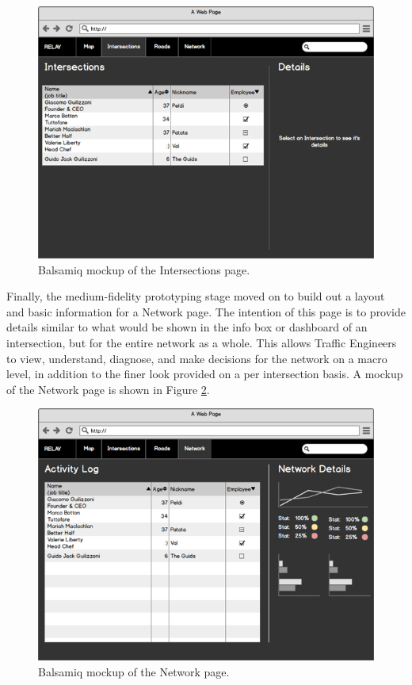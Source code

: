 \documentclass{report}
\begin{document}
\begin{figure}[htbp!]
  \begin{centering}
    \includegraphics[scale=0.65]{figures/bals-4.png}
    \caption{Balsamiq mockup of the Intersections page.}
    \label{fig:bals-4}
  \end{centering}
\end{figure}

Finally, the medium-fidelity prototyping stage moved on to build out a layout and basic information for a Network page.
The intention of this page is to provide details similar to what would be shown in the info box or dashboard of an intersection, but for the entire network as a whole.
This allows Traffic Engineers to view, understand, diagnose, and make decisions for the network on a macro level, in addition to the finer look provided on a per intersection basis.
A mockup of the Network page is shown in Figure \ref{fig:bals-5}. \\

\begin{figure}[htbp!]
  \begin{centering}
    \includegraphics[scale=0.6]{figures/bals-5.png}
    \caption{Balsamiq mockup of the Network page.}
    \label{fig:bals-5}
  \end{centering}
\end{figure}
\end{document}
